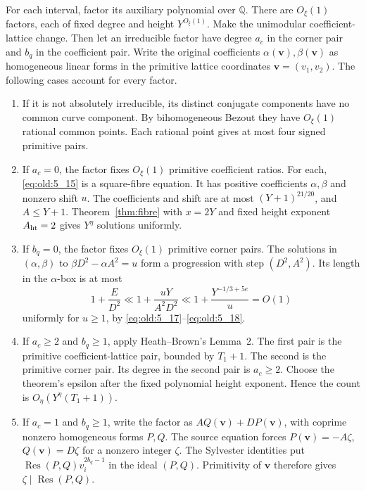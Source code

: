 For each interval, factor its auxiliary polynomial over \(\mathbb Q\).
There are \(O_\xi(1)\) factors, each of fixed degree and height \(Y^{O_\xi(1)}\).
Make the unimodular coefficient-lattice change. Then let an irreducible
factor have degree \(a_c\) in the corner pair and \(b_q\) in the
coefficient pair. Write the original coefficients \(\alpha(\mathbf v),\beta(\mathbf v)\)
as homogeneous linear forms in the primitive
lattice coordinates \(\mathbf v=(v_1,v_2)\). The following cases account for
every factor.

\begin{enumerate}
\item If it is not absolutely irreducible, its distinct conjugate
components have no common curve component. By bihomogeneous Bezout they have \(O_\xi(1)\)
rational common points. Each rational point gives at
most four signed primitive pairs.
\item If \(a_c=0\), the factor fixes \(O_\xi(1)\) primitive coefficient
ratios. For each, \eqref{eq:old:5_15} is a square-fibre equation. It has positive
coefficients \(\alpha,\beta\) and nonzero shift \(u\). The coefficients and
shift are at most \((Y+1)^{21/20}\), and \(A\le Y+1\). Theorem~\ref{thm:fibre}
with \(x=2Y\) and fixed height exponent \(A_{\rm ht}=2\) gives \(Y^\eta\)
solutions uniformly.
\item If \(b_q=0\), the factor fixes \(O_\xi(1)\) primitive corner pairs.
The solutions in \((\alpha,\beta)\) to
\(\beta D^2-\alpha A^2=u\) form a progression with step
\((D^2,A^2)\). Its length in the \(\alpha\)-box is at most
\[
 1+\frac{E}{D^2}\ll 1+\frac{uY}{A^2D^2}
 \ll 1+\frac{Y^{-1/3+5e}}u=O(1)
\]
uniformly for \(u\ge1\), by \eqref{eq:old:5_17}--\eqref{eq:old:5_18}.
\item If \(a_c\ge2\) and \(b_q\ge1\), apply Heath--Brown's
Lemma~2. The first pair is the primitive coefficient-lattice pair,
bounded by \(T_1+1\). The second is the primitive corner pair. Its degree
in the second pair is \(a_c\ge2\). Choose the theorem's epsilon after
the fixed polynomial height exponent. Hence the count is
\(O_\eta(Y^\eta(T_1+1))\).
\item If \(a_c=1\) and \(b_q\ge1\), write the factor as
\(A Q(\mathbf v)+D P(\mathbf v)\), with coprime nonzero homogeneous forms
\(P,Q\). The source equation forces \(P(\mathbf v)=-A\zeta\),
\(Q(\mathbf v)=D\zeta\) for a nonzero integer \(\zeta\). The Sylvester
identities put
\(\operatorname{Res}(P,Q)v_i^{2b_q-1}\) in the ideal \((P,Q)\).
Primitivity of \(\mathbf v\) therefore gives
\(\zeta\mid\operatorname{Res}(P,Q)\).

\end{enumerate}
